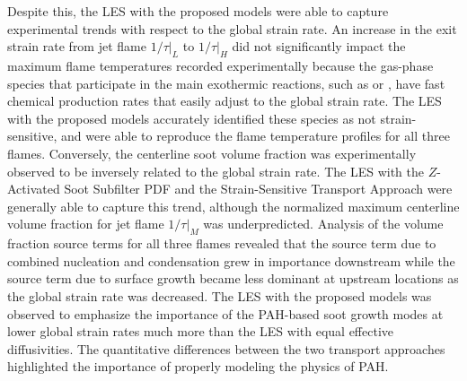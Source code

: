 Despite this, the LES with the proposed models were able to capture experimental trends with respect to the global strain rate. An increase in the exit strain rate from jet flame $1/\tau|_L$ to $1/\tau|_H$ did not significantly impact the maximum flame temperatures recorded experimentally because the gas-phase species that participate in the main exothermic reactions, such as  or , have fast chemical production rates that easily adjust to the global strain rate. The LES with the proposed models accurately identified these species as not strain-sensitive, and were able to reproduce the flame temperature profiles for all three flames. Conversely, the centerline soot volume fraction was experimentally observed to be inversely related to the global strain rate. The LES with the $Z$-Activated Soot Subfilter PDF and the Strain-Sensitive Transport Approach were generally able to capture this trend, although the normalized maximum centerline volume fraction for jet flame $1/\tau|_M$ was underpredicted. Analysis of the volume fraction source terms for all three flames revealed that the source term due to combined nucleation and condensation grew in importance downstream while the source term due to surface growth became less dominant at upstream locations as the global strain rate was decreased. The LES with the proposed models was observed to emphasize the importance of the PAH-based soot growth modes at lower global strain rates much more than the LES with equal effective diffusivities. The quantitative differences between the two transport approaches highlighted the importance of properly modeling the physics of PAH.


